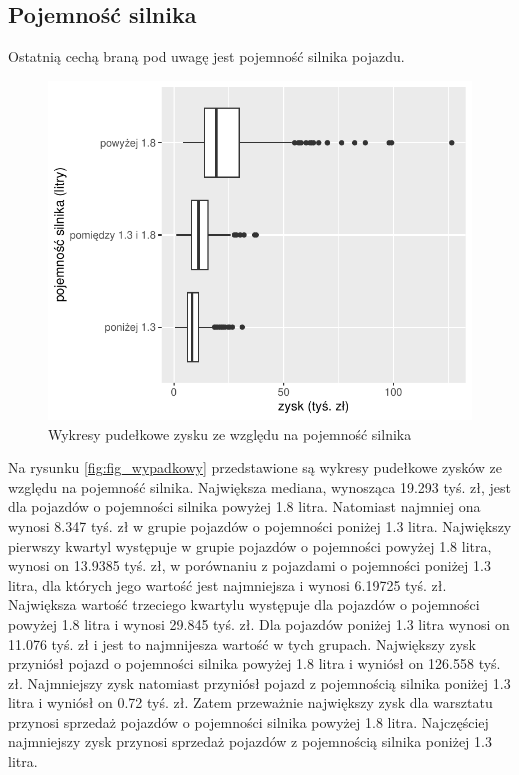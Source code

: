 \documentclass{article}\usepackage[]{graphicx}\usepackage[]{xcolor}
\makeatletter
\def\maxwidth{ %
  \ifdim\Gin@nat@width>\linewidth
    \linewidth
  \else
    \Gin@nat@width
  \fi
}
\newenvironment{knitrout}{}{} %
\makeatother
\begin{document}
\subsection{Pojemność silnika}

Ostatnią cechą braną pod uwagę jest pojemność silnika pojazdu.

\begin{knitrout}
\color{fgcolor}\begin{figure}[H]

{\centering \includegraphics[width=\maxwidth]{figure/fig_pojemnosc-1} 

}

\caption[Wykresy pudełkowe zysku ze względu na pojemność silnika]{Wykresy pudełkowe zysku ze względu na pojemność silnika}\label{fig:fig_pojemnosc}
\end{figure}

\end{knitrout}

Na rysunku \ref{fig:fig_wypadkowy} przedstawione są wykresy pudełkowe zysków ze względu na pojemność silnika. Największa mediana, wynosząca 19.293 tyś. zł, jest dla pojazdów o pojemności silnika powyżej 1.8 litra. Natomiast najmniej ona wynosi 8.347 tyś. zł w grupie pojazdów o pojemności poniżej 1.3 litra. 
Największy pierwszy kwartyl występuje w grupie pojazdów o pojemności powyżej 1.8 litra, wynosi on 13.9385 tyś. zł, w porównaniu z pojazdami o pojemności poniżej 1.3 litra, dla których jego wartość jest najmniejsza i wynosi 6.19725 tyś. zł.
Największa wartość trzeciego kwartylu występuje dla pojazdów o pojemności powyżej 1.8 litra i wynosi 29.845 tyś. zł. Dla pojazdów poniżej 1.3 litra wynosi on 11.076 tyś. zł i jest to najmnijesza wartość w tych grupach.
Największy zysk przyniósł pojazd o pojemności silnika powyżej 1.8 litra i wyniósł on 126.558 tyś. zł. 
Najmniejszy zysk natomiast przyniósł pojazd z pojemnością silnika poniżej 1.3 litra i wyniósł on 0.72 tyś. zł. Zatem przeważnie największy zysk dla warsztatu przynosi sprzedaż pojazdów o pojemności silnika powyżej 1.8 litra. Najczęściej najmniejszy zysk przynosi sprzedaż pojazdów z pojemnością silnika poniżej 1.3 litra.
\end{document}
